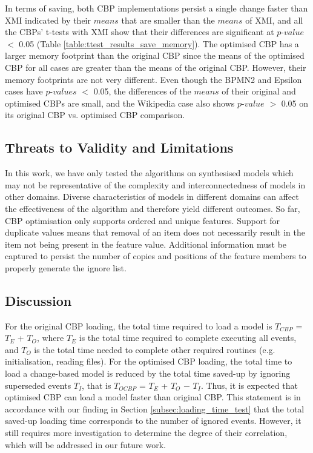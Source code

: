 \documentclass{llncs}
\begin{document}
{    In terms of saving, both CBP implementations persist a single change faster than XMI indicated by their $means$ that are smaller than the $means$ of XMI, and all the CBPs' t-tests with XMI show that their differences are significant at $p$-$value$ $<$ 0.05 (Table \ref{table:ttest_results_save_memory}). The optimised CBP has a larger memory footprint than the original CBP since the means of the optimised CBP for all cases are greater than the means of the original CBP. However, their memory footprints are not very different. Even though the BPMN2 and Epsilon cases have $p$-$values$ $<$ 0.05, the differences of the $means$ of their original and optimised CBPs are small, and the Wikipedia case also shows $p$-$value$ $>$ 0.05 on its original CBP vs. optimised CBP comparison.   
   
    \vspace{-15pt}
    \subsection{Threats to Validity and Limitations}
    \label{sec:limitations_and_future_work}
    
    \vspace{-10pt}
    In this work, we have only tested the algorithms on synthesised  models which may not be representative of the complexity and interconnectedness of models in other domains. Diverse characteristics of models in different domains can affect the effectiveness of the algorithm and therefore yield different outcomes. So far, CBP optimisation only supports ordered and unique features. Support for duplicate values means that removal of an item does not necessarily result in the item not being present in the feature value. Additional information must be captured to persist the number of copies and positions of the feature members to properly generate the ignore list. 
    
    \vspace{-15pt}
     \subsection{Discussion}
    \label{sec:discussion}
    
    \vspace{-10pt}
    For the original CBP loading, the total time required to load a model is $T_{CBP}$ = $T_E$ + $T_O$, where $T_E$ is the total time required to complete executing all events, and $T_O$ is the total time needed to complete other required routines (e.g. initialisation, reading files). For the optimised CBP loading, the total time to load a change-based model is reduced by the total time saved-up by ignoring superseded events $T_I$, that is $T_{OCBP}$ = $T_E$ + $T_O$ $-$ $T_I$. Thus, it is expected that optimised CBP can load a model faster than original CBP. This statement is in accordance with our finding in Section \ref{subsec:loading_time_test} that the total saved-up loading time corresponds to the number of ignored events. However, it still requires more investigation to determine the degree of their correlation, which will be addressed in our future work.
    
}
\end{document}
